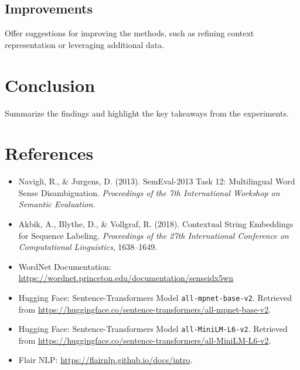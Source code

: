 \documentclass[11pt]{article}
\begin{document}
\subsection{Improvements}
Offer suggestions for improving the methods, such as refining context representation or leveraging additional data.

\section{Conclusion}
Summarize the findings and highlight the key takeaways from the experiments.

\section*{References}
\begin{itemize}
    \item Navigli, R., \& Jurgens, D. (2013). SemEval-2013 Task 12: Multilingual Word Sense Disambiguation. \emph{Proceedings of the 7th International Workshop on Semantic Evaluation}.
    \item Akbik, A., Blythe, D., \& Vollgraf, R. (2018). Contextual String Embeddings for Sequence Labeling. \emph{Proceedings of the 27th International Conference on Computational Linguistics}, 1638--1649.
    \item WordNet Documentation: \url{https://wordnet.princeton.edu/documentation/senseidx5wn}
    \item Hugging Face: Sentence-Transformers Model \texttt{all-mpnet-base-v2}. Retrieved from \url{https://huggingface.co/sentence-transformers/all-mpnet-base-v2}.
    \item Hugging Face: Sentence-Transformers Model \texttt{all-MiniLM-L6-v2}. Retrieved from \url{https://huggingface.co/sentence-transformers/all-MiniLM-L6-v2}.
    \item Flair NLP:  \url{https://flairnlp.github.io/docs/intro}.
\end{itemize}
\end{document}

